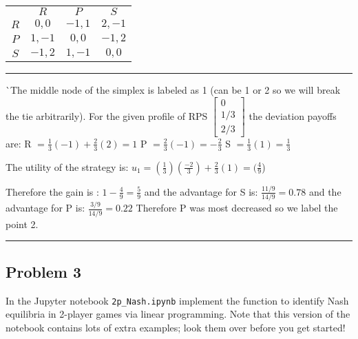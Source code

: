 \documentclass[11pt]{article}
\newcommand{\answer}[1]{
\vspace{.5\baselineskip} \hrule \vspace{.5\baselineskip}
#1
\vspace{.5\baselineskip} \hrule \vspace{.5\baselineskip}
}
\begin{document}
\begin{multicols}{2}

\columnbreak

{\Large
\begin{tabular}{ c | c | c | c |}
\multicolumn{1}{c}{} & \multicolumn{1}{c}{$R$} & \multicolumn{1}{c}{$P$} & \multicolumn{1}{c}{$S$} \\ \cline{2-4}
$R$ & $0,0$ & $-1,1$ & $2,-1$ \\ \cline{2-4}
$P$ & $1,-1$ & $0,0$ & $-1,2$ \\ \cline{2-4}
$S$ & $-1,2$ & $1,-1$ & $0,0$ \\ \cline{2-4}
\end{tabular}
}
\end{multicols}


\answer{
^^ The middle node of the simplex is labeled as 1 (can be 1 or 2 so we will break the tie arbitrarily).  
For the given profile of RPS $\begin{bmatrix} 0 \\ 1/3 \\ 2/3 \end{bmatrix}$ the deviation payoffs are: \newline
R $=\frac{1}{3}(-1)+\frac{2}{3}(2) = 1$ \newline \newline
P $=\frac{2}{3}(-1) = -\frac{2}{3}$ \newline \newline
S $=\frac{1}{3}(1) = \frac{1}{3}$ \newline \newline

The utility of the strategy is: \newline
$u_{1} =(\frac{1}{3})(\frac{-2}{3})+\frac{2}{3}(1) = (\frac{4}{9}$) \newline \newline

Therefore the gain is : $1-\frac{4}{9}=\frac{5}{9}$
and the advantage for S is: $\frac{11/9}{14/9} =0.78$  and the advantage for P is: $\frac{3/9}{14/9}=0.22$ Therefore P was most decreased so we label the point 2.


}

\subsection*{Problem 3}

In the Jupyter notebook \texttt{2p\_Nash.ipynb} implement the function to identify Nash equilibria in 2-player games via linear programming.
Note that this version of the notebook contains lots of extra examples; look them over before you get started!
\end{document}

